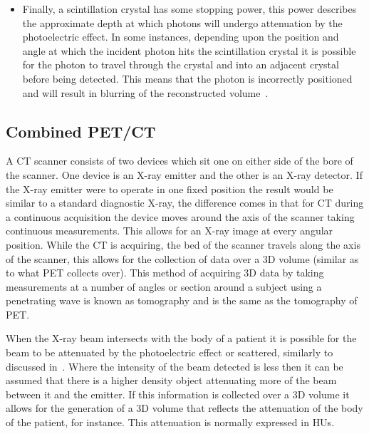 \begin{itemize}
                    \item Finally, %
                    a scintillation crystal has some stopping power, this power describes the approximate depth at which photons will undergo attenuation by the photoelectric effect. In some instances, depending upon the position and angle at which the incident photon hits the scintillation crystal it is possible for the photon to travel through the crystal and into an adjacent crystal before being detected. This means that the photon is incorrectly positioned and will result in blurring of the reconstructed volume~\parencite{Nieman2015}.
                \end{itemize}
        
        \subsection{Combined PET/CT} \label{sec:combined_pet_ct}
            A \gls{CT} scanner consists of two devices which sit one on either side of the bore of the scanner. %
            One device is an X-ray emitter and the other is an X-ray detector. If the X-ray emitter were to operate in one fixed position the result would be similar to a standard diagnostic X-ray, the difference comes in that for \gls{CT} during a continuous acquisition the device moves around the axis of the scanner taking continuous measurements. This allows for an X-ray image at every angular position. While the \gls{CT} is acquiring, the bed of the scanner travels along the axis of the scanner, %
            this allows for the collection of data over a \gls{3D} volume (similar as to what \gls{PET} collects over). This method of acquiring \gls{3D} data by taking measurements at a number of angles or section around a subject using a penetrating wave is known as tomography and is the same as the tomography of \gls{PET}.
            
            When the X-ray beam intersects with the body of a patient it is possible for the beam to be attenuated by the photoelectric effect or scattered,%
            similarly to discussed in~. Where the intensity of the beam detected is less then it can be assumed that there is a higher density object attenuating more of the beam between it and the emitter. If this information is collected over a \gls{3D} volume it allows for the generation of a \gls{3D} volume that reflects the attenuation of the body of the patient, for instance. This attenuation is normally expressed in \glspl{HU}.
            
